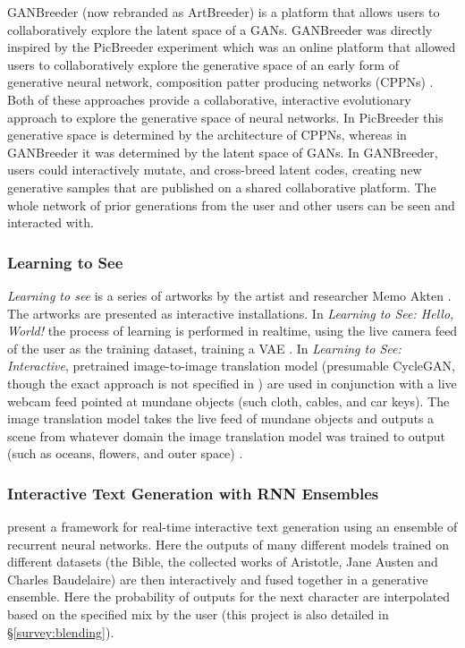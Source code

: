 GANBreeder (now rebranded as ArtBreeder) \citep{simon2020artbreeder} is a platform that allows users to collaboratively explore the latent space of a GANs.
GANBreeder was directly inspired by the PicBreeder experiment \citep{secretan2008picbreeder,secretan2011picbreeder} which was an online platform that allowed users to collaboratively explore the generative space of an early form of generative neural network, composition patter producing networks (CPPNs) \citep{stanley2007compositional}.
Both of these approaches provide a collaborative, interactive evolutionary approach to explore the generative space of neural networks. 
In PicBreeder this generative space is determined by the architecture of CPPNs, whereas in GANBreeder it was determined by the latent space of GANs.
In GANBreeder, users could interactively mutate, and cross-breed latent codes, creating new generative samples that are published on a shared collaborative platform.
The whole network of prior generations from the user and other users can be seen and interacted with.

\subsubsection{Learning to See}

\textit{Learning to see} is a series of artworks by the artist and researcher Memo Akten \citep{akten2019learning, celis2021memo}.
The artworks are presented as interactive installations.
In \textit{Learning to See: Hello, World!} the process of learning is performed in realtime, using the live camera feed of the user as the training dataset, training a VAE \citep{akten2017hello}.
In  \textit{Learning to See: Interactive}, pretrained image-to-image translation model (presumable CycleGAN, though the exact approach is not specified in \citep{akten2019learning}) are used in conjunction with a live webcam feed pointed at mundane objects (such cloth, cables, and car keys).
The image translation model takes the live feed of mundane objects and outputs a scene from whatever domain the image translation model was trained to output (such as oceans, flowers, and outer space) \citep{akten2017interactive}.

\subsubsection{Interactive Text Generation with RNN Ensembles}

\cite{akten2016real} present a framework for real-time interactive text generation using an ensemble of recurrent neural networks. 
Here the outputs of many different models trained on different datasets (the Bible, the collected works of Aristotle, Jane Austen and Charles Baudelaire) are then interactively and fused together in a generative ensemble.
Here the probability of outputs for the next character are interpolated based on the specified mix by the user (this project is also detailed in \S \ref{survey:blending}).


